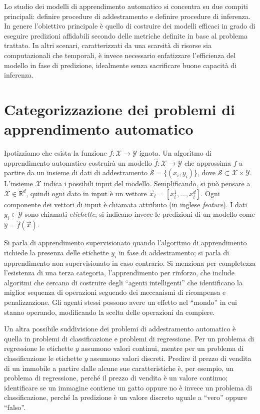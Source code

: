 Lo studio dei modelli di apprendimento automatico si concentra su due compiti principali: definire procedure di addestramento e definire procedure di inferenza. 
In genere l'obiettivo principale è quello di costruire dei modelli efficaci in grado di eseguire predizioni affidabili secondo delle metriche definite in base al problema trattato. 
In altri scenari, caratterizzati da una scarsità di risorse sia computazionali che temporali, è invece necessario enfatizzare l'efficienza del modello in fase di predizione, idealmente senza sacrificare buone capacità di inferenza.

\section{Categorizzazione dei problemi di apprendimento automatico}\label{sec:tipi_problemi_ml}
Ipotizziamo che esista la funzione $f:\mathcal{X}\rightarrow\mathcal{Y}$ ignota. 
Un algoritmo di apprendimento automatico costruirà un modello $\hat{f}:\mathcal{X}\rightarrow\mathcal{Y}$ che approssima $f$ a partire da un insieme di dati di addestramento $\mathcal{S}=\{(x_i, y_i)\}$, dove $\mathcal{S} \subset \mathcal{X} \times \mathcal{Y}$.
L'insieme $\mathcal{X}$ indica i possibili input del modello. Semplificando, si può pensare a $\mathcal{X} \in \mathbb{R}^d$, quindi ogni dato in input è un vettore $\Vec{x}_i=[x_i^1,\dots,x_i^d]$.
Ogni componente dei vettori di input è chiamata attributo (in inglese \emph{feature}).
I dati $y_i \in \mathcal{Y}$ sono chiamati \emph{etichette}; si indicano invece le predizioni di un modello come $\hat{y} = \hat{f}(\Vec{x})$. 

Si parla di apprendimento supervisionato quando l'algoritmo di apprendimento richiede la presenza delle etichette $y_i$ in fase di addestramento; si parla di apprendimento non supervisionato in caso contrario.
Si menziona per completezza l'esistenza di una terza categoria, l'apprendimento per rinforzo, che include algoritmi che cercano di costruire degli ``agenti intelligenti'' che identificano la miglior sequenza di operazioni seguendo dei meccanismi di ricompensa e penalizzazione. 
Gli agenti stessi possono avere un effetto nel ``mondo'' in cui stanno operando, modificando la scelta delle operazioni da compiere.

Un altra possibile suddivisione dei problemi di addestramento automatico è quella in problemi di classificazione e problemi di regressione.
Per un problema di regressione le etichette $y$ assumono valori continui, mentre per un problema di classificazione le etichette $y$ assumono valori discreti. 
Predire il prezzo di vendita di un immobile a partire dalle alcune sue caratteristiche è, per esempio, un problema di regressione, perché il prezzo di vendita è un valore continuo;
identificare se un immagine contiene un gatto oppure no è invece un problema di classificazione, perché la predizione è un valore discreto uguale a ``vero'' oppure ``falso''.

